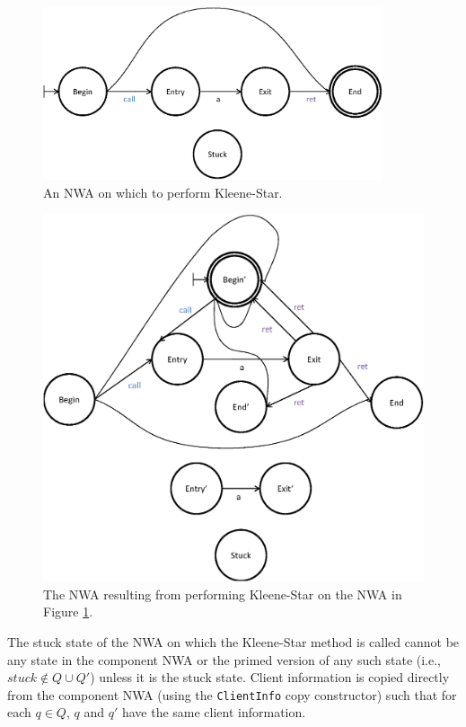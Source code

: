 \documentclass{llncs}
\begin{document}
\begin{figure}[htbp]
  \centering
    \includegraphics[width=10cm]{Figures/Figure11.eps}
  \caption{An NWA on which to perform Kleene-Star.}
  \label{Fig:Star1}
\end{figure}

\begin{figure}[htbp]
  \centering
    \includegraphics[width=12cm]{Figures/Figure12.eps}
  \caption{The NWA resulting from performing Kleene-Star on the NWA in Figure \ref{Fig:Star1}.}
  \label{Fig:Star2}
\end{figure}

The stuck state of the NWA on which the Kleene-Star method is called cannot be any state in the component NWA or the primed version of any such state (i.e., $stuck \not\in Q \cup Q'$) unless it is the stuck state.  Client information is copied directly from the component NWA (using the \texttt{ClientInfo} copy constructor) such that for each $q \in Q$, $q$ and $q'$ have the same client information.   
\end{document}
